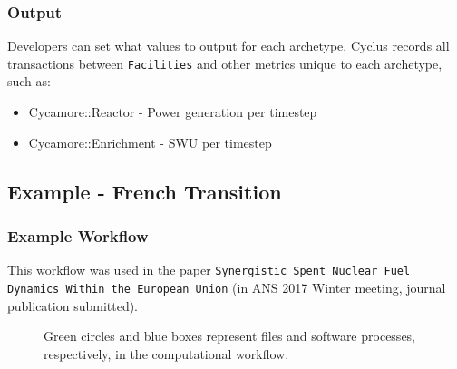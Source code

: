 \begin{frame}
    \frametitle{Output}
    Developers can set what values to output for each archetype.
    Cyclus records all transactions between \texttt{Facilities}
    and other metrics unique to each archetype, such as:
    \begin{itemize}
        \item Cycamore::Reactor - Power generation per timestep
        \item Cycamore::Enrichment - SWU per timestep
    \end{itemize}
\end{frame}


\subsection{Example - French Transition}
\begin{frame}
    \frametitle{Example Workflow}
    This workflow was used in the paper \texttt{Synergistic Spent Nuclear Fuel Dynamics Within the European Union} (in ANS 2017 Winter meeting, journal publication submitted).

\begin{figure}
\caption{Green circles and blue boxes represent files and software 
processes, respectively, in the computational workflow.}
\label{diag:comp}
\end{figure}

\end{frame}

